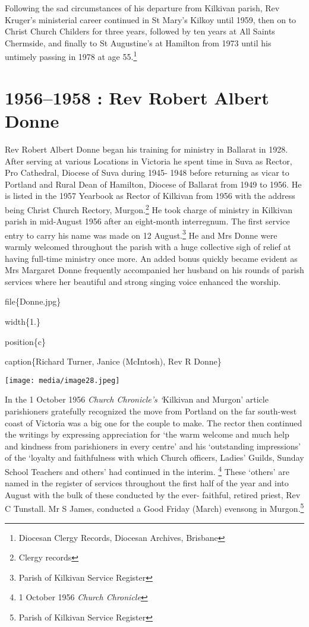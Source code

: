 Following the sad circumstances of his departure from Kilkivan parish, Rev Kruger's ministerial career continued in St Mary's Kilkoy until 1959, then on to Christ Church Childers for three years, followed by ten years at All Saints Chermside, and finally to St Augustine's at Hamilton from 1973 until his untimely passing in 1978 at age 55.\footnote{Diocesan Clergy Records, Diocesan Archives, Brisbane}

\hypertarget{rev-robert-albert-donne}{%
\chapter{1956--1958 : Rev Robert Albert Donne}\label{rev-robert-albert-donne}}

Rev Robert Albert Donne began his training for ministry in Ballarat in 1928. After serving at various Locations in Victoria he spent time in Suva as Rector, Pro Cathedral, Diocese of Suva during 1945- 1948 before returning as vicar to Portland and Rural Dean of Hamilton, Diocese of Ballarat from 1949 to 1956. He is listed in the 1957 Yearbook as Rector of Kilkivan from 1956 with the address being Christ Church Rectory, Murgon.\footnote{Clergy records} He took charge of ministry in Kilkivan parish in mid-August 1956 after an eight-month interregnum. The first service entry to carry his name was made on 12 August.\footnote{Parish of Kilkivan Service Register} He and Mrs Donne were warmly welcomed throughout the parish with a huge collective sigh of relief at having full-time ministry once more. An added bonus quickly became evident as Mrs Margaret Donne frequently accompanied her husband on his rounds of parish services where her beautiful and strong singing voice enhanced the worship.

file\{Donne.jpg\}

width\{1.\}

position\{c\}

caption\{Richard Turner, Janice (McIntosh), Rev R Donne\}

\texttt{[image: media/image28.jpeg]}

In the 1 October 1956 \emph{Church Chronicle's `}Kilkivan and Murgon' article parishioners gratefully recognized the move from Portland on the far south-west coast of Victoria was a big one for the couple to make. The rector then continued the writings by expressing appreciation for `the warm welcome and much help and kindness from parishioners in every centre' and his `outstanding impressions' of the `loyalty and faithfulness with which Church officers, Ladies' Guilds, Sunday School Teachers and others' had continued in the interim. \footnote{1 October 1956 \emph{Church Chronicle}} These `others' are named in the register of services throughout the first half of the year and into August with the bulk of these conducted by the ever- faithful, retired priest, Rev C Tunstall. Mr S James, conducted a Good Friday (March) evensong in Murgon.\footnote{Parish of Kilkivan Service Register}

